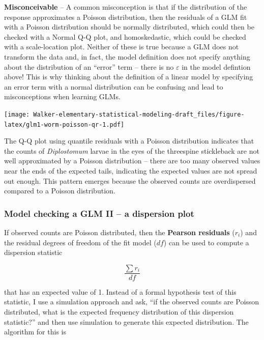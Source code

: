 \documentclass[]{book}
\begin{document}
\textbf{Misconceivable} -- A common misconception is that if the distribution of the response approximates a Poisson distribution, then the residuals of a GLM fit with a Poisson distribution should be normally distributed, which could then be checked with a Normal Q-Q plot, and homoskedastic, which could be checked with a scale-location plot. Neither of these is true because a GLM does not transform the data and, in fact, the model definition does not specify anything about the distribution of an ``error'' term -- there is no \(\varepsilon\) in the model defintion above! This is why thinking about the definition of a linear model by specifying an error term with a normal distribution can be confusing and lead to misconceptions when learning GLMs.

\texttt{[image: Walker-elementary-statistical-modeling-draft\_files/figure-latex/glm1-worm-poisson-qr-1.pdf]}

The Q-Q plot using quantile residuals with a Poisson distribution indicates that the counts of \emph{Diplostomum} larvae in the eyes of the threespine stickleback are not well approximated by a Poisson distribution -- there are too many observed values near the ends of the expected tails, indicating the expected values are not spread out enough. This pattern emerges because the observed counts are overdispersed compared to a Poisson distribution.

\hypertarget{model-checking-a-glm-ii-a-dispersion-plot}{%
\subsubsection{Model checking a GLM II -- a dispersion plot}\label{model-checking-a-glm-ii-a-dispersion-plot}}

If observed counts are Poisson distributed, then the \textbf{Pearson residuals} (\(r_i\)) and the residual degrees of freedom of the fit model (\(df\)) can be used to compute a dispersion statistic

\begin{equation}
\frac{\sum{r_i}}{df}
\end{equation}

that has an expected value of 1. Instead of a formal hypothesis test of this statistic, I use a simulation approach and ask, ``if the observed counts are Poisson distributed, what is the expected frequency distribution of this dispersion statistic?'' and then use simulation to generate this expected distribution. The algorithm for this is
\end{document}
